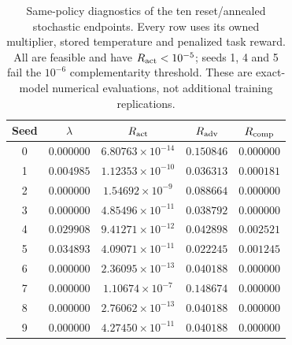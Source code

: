 \begin{table}[htbp]
\caption{Same-policy diagnostics of the ten reset/annealed stochastic endpoints. Every row uses its owned multiplier, stored temperature and penalized task reward. All are feasible and have $R_{\rm act}<10^{-5}$; seeds 1, 4 and 5 fail the $10^{-6}$ complementarity threshold. These are exact-model numerical evaluations, not additional training replications.}
\label{comp:tab:saved_policy_diagnostics}
\centering\begingroup\small
\begin{tabular*}{\linewidth}{@{\extracolsep{\fill}}ccccc@{}}
\toprule
Seed & $\lambda$ & $R_{\rm act}$ & $R_{\rm adv}$ & $R_{\rm comp}$ \\
\midrule
0 & $0.000000$ & $6.80763\times10^{-14}$ & $0.150846$ & $0.000000$ \\
1 & $0.004985$ & $1.12353\times10^{-10}$ & $0.036313$ & $0.000181$ \\
2 & $0.000000$ & $1.54692\times10^{-9}$ & $0.088664$ & $0.000000$ \\
3 & $0.000000$ & $4.85496\times10^{-11}$ & $0.038792$ & $0.000000$ \\
4 & $0.029908$ & $9.41271\times10^{-12}$ & $0.042898$ & $0.002521$ \\
5 & $0.034893$ & $4.09071\times10^{-11}$ & $0.022245$ & $0.001245$ \\
6 & $0.000000$ & $2.36095\times10^{-13}$ & $0.040188$ & $0.000000$ \\
7 & $0.000000$ & $1.10674\times10^{-7}$ & $0.148674$ & $0.000000$ \\
8 & $0.000000$ & $2.76062\times10^{-13}$ & $0.040188$ & $0.000000$ \\
9 & $0.000000$ & $4.27450\times10^{-11}$ & $0.040188$ & $0.000000$ \\
\bottomrule
\end{tabular*}
\endgroup
\end{table}
